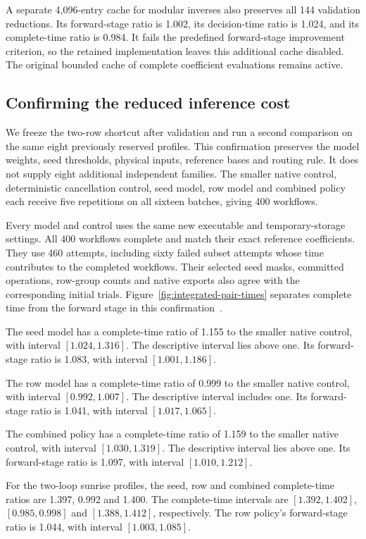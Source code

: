 A separate 4,096-entry cache for modular inverses also preserves all 144 validation reductions. Its forward-stage ratio is 1.002, its decision-time ratio is 1.024, and its complete-time ratio is 0.984. It fails the predefined forward-stage improvement criterion, so the retained implementation leaves this additional cache disabled. The original bounded cache of complete coefficient evaluations remains active.

\subsection{Confirming the reduced inference cost}
We freeze the two-row shortcut after validation and run a second comparison
on the same eight previously reserved profiles. This confirmation preserves
the model weights, seed thresholds, physical inputs, reference bases and
routing rule. It does not supply eight additional independent families.
The smaller native control, deterministic cancellation control, seed model,
row model and combined policy each receive five repetitions on all sixteen
batches, giving 400 workflows.

Every model and control uses the same new executable and temporary-storage
settings. All 400 workflows complete and match their exact reference
coefficients. They use 460 attempts, including sixty failed subset attempts
whose time contributes to the completed workflows. Their selected seed masks, committed operations, row-group
counts and native exports also agree with the corresponding initial trials.
Figure~\ref{fig:integrated-pair-times} separates complete time from the
forward stage in this confirmation~\cite{KiraIntegratedRuntimeData}.

The seed model has a complete-time ratio of 1.155 to the smaller native control, with interval $[1.024,1.316]$. The descriptive interval lies above one. Its forward-stage ratio is 1.083, with interval $[1.001,1.186]$.

The row model has a complete-time ratio of 0.999 to the smaller native control, with interval $[0.992,1.007]$. The descriptive interval includes one. Its forward-stage ratio is 1.041, with interval $[1.017,1.065]$.

The combined policy has a complete-time ratio of 1.159 to the smaller native control, with interval $[1.030,1.319]$. The descriptive interval lies above one. Its forward-stage ratio is 1.097, with interval $[1.010,1.212]$.

For the two-loop sunrise profiles, the seed, row and combined complete-time ratios are 1.397, 0.992 and 1.400. The complete-time intervals are $[1.392,1.402]$, $[0.985,0.998]$ and $[1.388,1.412]$, respectively. The row policy's forward-stage ratio is 1.044, with interval $[1.003,1.085]$.

